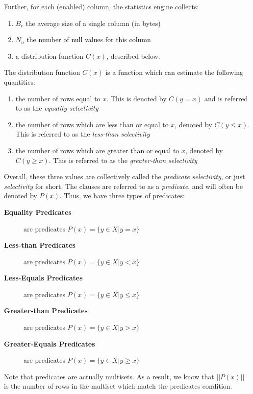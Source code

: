 \documentclass[10pt]{amsart}
\begin{document}
Further, for each (enabled) column, the statistics engine collects:

\begin{enumerate}
				\item $B_c$ the average size of a single column (in bytes)
				\item $N_n$ the number of null values for this column
				\item a distribution function $C(x)$, described below.
\end{enumerate}

The distribution function $C(x)$ is a function which can estimate the following quantities:

\begin{enumerate}
				\item the number of rows equal to $x$. This is denoted by $C(y=x)$ and is referred to as the \emph{equality selectivity}
				\item the number of rows which are less than or equal to $x$, denoted by $C(y\leq x)$. This is referred to as the \emph{less-than selectivity}
				\item the number of rows which are greater than or equal to $x$, denoted by $C(y\geq x)$. This is referred to as the \emph{greater-than selectivity}
\end{enumerate}
Overall, these three values are collectively called the \emph{predicate selectivity}, or just \emph{selectivity} for short. The clauses are referred to as a \emph{predicate}, and will often be denoted by $P(x)$. Thus, we have three types of predicates:

\begin{description}
	\item[\textbf{Equality Predicates}] are predicates $P(x) = \lbrace y \in X | y = x \rbrace$
	\item[\textbf{Less-than Predicates}] are predicates $P(x) = \lbrace y \in X | y < x \rbrace$
	\item[\textbf{Less-Equals Predicates}] are predicates $P(x) = \lbrace y \in X | y \leq x \rbrace$
	\item[\textbf{Greater-than Predicates}] are predicates $P(x) = \lbrace y \in X | y > x \rbrace$
	\item[\textbf{Greater-Equals Predicates}] are predicates $P(x) = \lbrace y \in X | y \geq x \rbrace$
\end{description}

Note that predicates are actually multisets. As a result, we know that $||P(x)||$ is the number of rows in the multiset which match the predicates condition.
\end{document}
